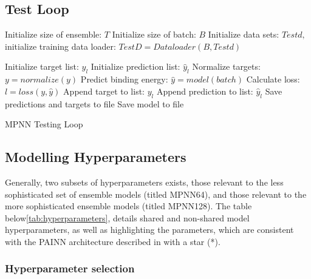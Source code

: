 \subsection{Test Loop}\label{subsec:test}

\begin{algorithm}[H]
    \begin{algorithmic}[2]
        \State Initialize size of ensemble: $T$
        \State Initialize size of batch: $B$
        \State Initialize data sets: $Testd, $
        \State initialize training data loader: $TestD = Dataloader(B,Testd)$

        \State Initialize target list: $y_{l}$
        \State Initialize prediction list: $\hat{y}_{l}$
        \State Normalize targets: $y = normalize(y)$
        \State Predict binding energy: $\hat{y} = model(batch)$
        \State Calculate loss: $l = loss(y,\hat{y})$
        \State Append target to list: $y_{l}$
        \State Append prediction to list: $\hat{y}_{l}$
        \EndFor
        \State Save predictions and targets to file
        \State Save model to file
        \EndFor
    \end{algorithmic}
    \caption{MPNN Testing Loop}
    \label{algo:MPNN_testing}
\end{algorithm}

\subsection{Modelling Hyperparameters}\label{subsec:mod-hyper}

Generally, two subsets of hyperparameters exists, those relevant to the less sophisticated set of ensemble models (titled MPNN64), and those
relevant to the more sophisticated ensemble models (titled MPNN128). The table below\ref{tab:hyperparameters},
details shared and non-shared model hyperparameters, as well
as highlighting the parameters, which are consistent with the PAINN architecture described in \cite{PAINN} with a star (*).

\subsubsection{Hyperparameter selection}\label{subsubsec:selec:hyperparam}

%

